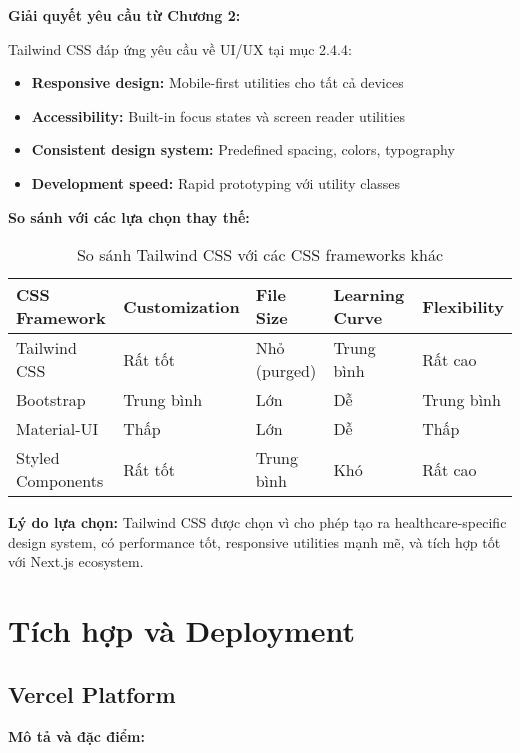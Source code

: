 \documentclass[../DoAn.tex]{subfiles}
\begin{document}
\textbf{Giải quyết yêu cầu từ Chương 2:}

Tailwind CSS đáp ứng yêu cầu về UI/UX tại mục 2.4.4:
\begin{itemize}
    \item \textbf{Responsive design:} Mobile-first utilities cho tất cả devices
    \item \textbf{Accessibility:} Built-in focus states và screen reader utilities
    \item \textbf{Consistent design system:} Predefined spacing, colors, typography
    \item \textbf{Development speed:} Rapid prototyping với utility classes
\end{itemize}

\textbf{So sánh với các lựa chọn thay thế:}

\begin{table}[H]
\centering
\begin{tabular}{|p{3cm}|p{2.5cm}|p{2.5cm}|p{2.5cm}|p{2.5cm}|}
\hline
\textbf{CSS Framework} & \textbf{Customization} & \textbf{File Size} & \textbf{Learning Curve} & \textbf{Flexibility} \\
\hline
Tailwind CSS & Rất tốt & Nhỏ (purged) & Trung bình & Rất cao \\
\hline
Bootstrap & Trung bình & Lớn & Dễ & Trung bình \\
\hline
Material-UI & Thấp & Lớn & Dễ & Thấp \\
\hline
Styled Components & Rất tốt & Trung bình & Khó & Rất cao \\
\hline
\end{tabular}
\caption{So sánh Tailwind CSS với các CSS frameworks khác}
\end{table}

\textbf{Lý do lựa chọn:} Tailwind CSS được chọn vì cho phép tạo ra healthcare-specific design system, có performance tốt, responsive utilities mạnh mẽ, và tích hợp tốt với Next.js ecosystem.

\section{Tích hợp và Deployment}
\label{section:3.7}

\subsection{Vercel Platform}
\label{subsection:3.7.1}

\textbf{Mô tả và đặc điểm:}
\end{document}
